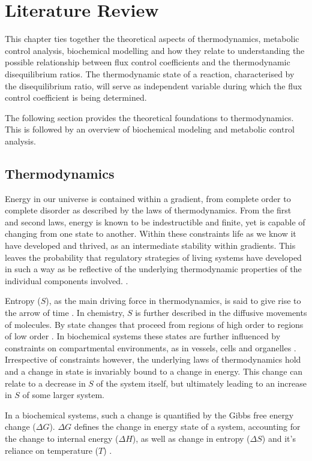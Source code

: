\chapter{Literature Review} \label{chp:2}
This chapter ties together the theoretical aspects of thermodynamics, metabolic control analysis, biochemical modelling and how they relate to understanding the possible relationship between flux control coefficients and the thermodynamic disequilibrium ratios. The thermodynamic state of a reaction, characterised by the disequilibrium ratio, will serve as independent variable during which the flux control coefficient is being determined.

The following section provides the theoretical foundations to thermodynamics. This is followed by an overview of biochemical modeling and metabolic control analysis.


\section{Thermodynamics}
Energy in our universe is contained within a gradient, from complete order to complete disorder as described by the laws of thermodynamics. From the first and second laws, energy is known to be indestructible and finite, yet is capable of changing from one state to another. Within these constraints life as we know it have developed and thrived, as an intermediate stability within gradients. This leaves the probability that regulatory strategies of living systems have developed in such a way as be reflective of the underlying thermodynamic properties of the individual components involved.
\cite{Schneider1994, Prigogine1998}. 

Entropy ($S$), as the main driving force in thermodynamics, is said to give rise to the arrow of time  \cite{Lebowitz1994}. In chemistry, $S$ is further described in the diffusive movements of molecules. By state changes that proceed from regions of high order to regions of low order \cite{Roos2014}. In biochemical systems these states are further influenced by constraints on compartmental environments, as in vessels, cells and organelles \cite{Kramers1940, Burada2009}. Irrespective of constraints however, the underlying laws of thermodynamics hold and a change in state is invariably bound to a change in energy. This change can relate to a decrease in $S$ of the system itself, but ultimately leading to an increase in $S$ of some larger system. 

In a biochemical systems, such a change is quantified by the Gibbs free energy change ($\Delta G$). $\Delta G$ defines the change in energy state of a system, accounting for the change to internal energy ($\Delta H$), as well as change in entropy ($\Delta S$) and it's reliance on temperature ($T$) \cite{Job2016, LEFFLER1955}.

